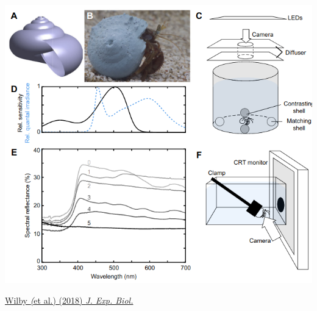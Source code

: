 \documentclass{beamer} %
\begin{document}
  \begin{frame}
    \begin{center}
      \includegraphics[height=0.9\textheight]{hermits.png}
    \end{center}
      \tiny
      \href{https://doi.org/10.1242/jeb.173831}{Wilby \textit(et al.) (2018) \textit{J. Exp. Biol.}}
  \end{frame}
\end{document}
